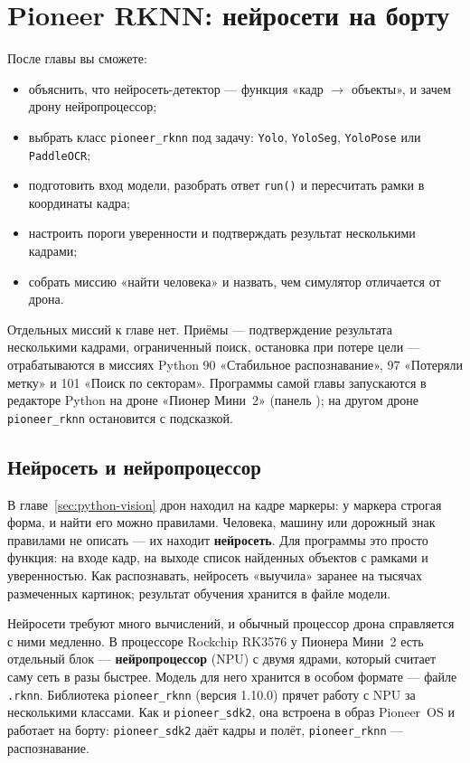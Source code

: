 \section{Pioneer RKNN: нейросети на борту}
\label{sec:rknn}

\begin{infobox}
После главы вы сможете:
\begin{itemize}
    \item объяснить, что нейросеть-детектор --- функция «кадр $\to$ объекты», и зачем дрону нейропроцессор;
    \item выбрать класс \texttt{pioneer\_rknn} под задачу: \texttt{Yolo}, \texttt{YoloSeg}, \texttt{YoloPose} или \texttt{PaddleOCR};
    \item подготовить вход модели, разобрать ответ \verb|run()| и пересчитать рамки в координаты кадра;
    \item настроить пороги уверенности и подтверждать результат несколькими кадрами;
    \item собрать миссию «найти человека» и назвать, чем симулятор отличается от дрона.
\end{itemize}
\end{infobox}

\begin{missionbox}
Отдельных миссий к главе нет. Приёмы --- подтверждение результата несколькими кадрами, ограниченный поиск, остановка при потере цели --- отрабатываются в миссиях Python 90 «Стабильное распознавание», 97 «Потеряли метку» и 101 «Поиск по секторам». Программы самой главы запускаются в редакторе Python на дроне «Пионер Мини~2» (панель ); на другом дроне \texttt{pioneer\_rknn} остановится с подсказкой.
\end{missionbox}

\subsection{Нейросеть и нейропроцессор}

В главе~\ref{sec:python-vision} дрон находил на кадре маркеры: у маркера строгая форма, и найти его можно правилами. Человека, машину или дорожный знак правилами не описать --- их находит \textbf{нейросеть}. Для программы это просто функция: на входе кадр, на выходе список найденных объектов с рамками и уверенностью. Как распознавать, нейросеть «выучила» заранее на тысячах размеченных картинок; результат обучения хранится в файле модели.

Нейросети требуют много вычислений, и обычный процессор дрона справляется с ними медленно. В процессоре Rockchip RK3576 у Пионера Мини~2 есть отдельный блок --- \textbf{нейропроцессор} (NPU) с двумя ядрами, который считает саму сеть в разы быстрее. Модель для него хранится в особом формате --- файле \texttt{.rknn}. Библиотека \texttt{pioneer\_rknn} (версия 1.10.0) прячет работу с NPU за несколькими классами. Как и \texttt{pioneer\_sdk2}, она встроена в образ Pioneer~OS и работает на борту: \texttt{pioneer\_sdk2} даёт кадры и полёт, \texttt{pioneer\_rknn} --- распознавание.

